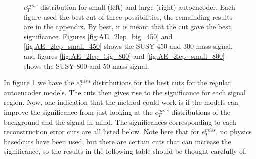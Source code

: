 \begin{figure}
\begin{subfigure}{.45\textwidth}
    \end{subfigure}
    \hfill      
    \caption[$e_T^{miss}$ best cuts for regular autoencoder]{$e_T^{miss}$ distribution for small (left) and large (right) autoencoder.
    Each figure used the best cut of three possibilities, the remainding results are in the appendix. By best, it is meant that the cut
    gave the best significance. Figures \ref{fig:AE_2lep_big_450} and \ref{fig:AE_2lep_small_450} shows the SUSY 450 and 300 mass signal, 
    and figures \ref{fig:AE_2lep_big_800} and \ref{fig:AE_2lep_small_800} shows the SUSY 800 and 50 mass signal.}
    \label{fig:AE_2lep_recon_err_both_sig_cut_etmiss}
\end{figure}

In figure \ref{fig:AE_2lep_recon_err_both_sig_cut_etmiss} we have the $e_T^{miss}$ distributions for the best cuts for the regular autoencoder models.
The cuts then gives rise to the significance for each signal region. Now, one indication that the method could work is if the models can improve the 
significance from just looking at the $e_T^{miss}$ distributions of the background and the signal in mind. The significances corresponding to each 
reconstruction error cuts are all listed below. Note here that for $e_T^{miss}$, no physics basedcuts have been used, but there are certain cuts 
that can increase the significance, so the results in the following table should be thought carefully of.

